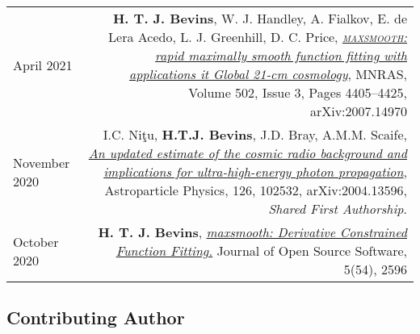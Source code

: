 \documentclass{article}
\begin{document}
\begin{tabular}{L!{\vrule}R}
	April 2021 & \textbf{H. T. J. Bevins}, W. J. Handley, A. Fialkov, E. de Lera Acedo, L. J. Greenhill, D. C. Price, \href{https://academic.oup.com/mnras/article/502/3/4405/6105349?guestAccessKey=769d7461-cc0b-4d83-9cdf-bc351056d911}{\textit{\textsc{maxsmooth}: rapid maximally smooth function fitting with applications it Global 21-cm cosmology}}, MNRAS, Volume 502, Issue 3, Pages 4405–4425, 
    arXiv:2007.14970\\
	November 2020 & I.C. Ni\c{t}u, \textbf{H.T.J. Bevins}, J.D. Bray, A.M.M. Scaife, \href{https://www.sciencedirect.com/science/article/pii/S0927650520301043?via\%3Dihub}{\textit{An updated estimate of the cosmic radio background and implications for ultra-high-energy photon propagation}}, Astroparticle Physics, 126, 102532, arXiv:2004.13596, \textit{Shared First Authorship}. \\
	October 2020 & \textbf{H. T. J. Bevins}, \href{https://joss.theoj.org/papers/10.21105/joss.02596}{\textit{maxsmooth: Derivative Constrained Function Fitting.}} Journal of Open Source Software, 5(54), 2596 \\
\end{tabular}

\subsection*{Contributing Author}
\end{document}
